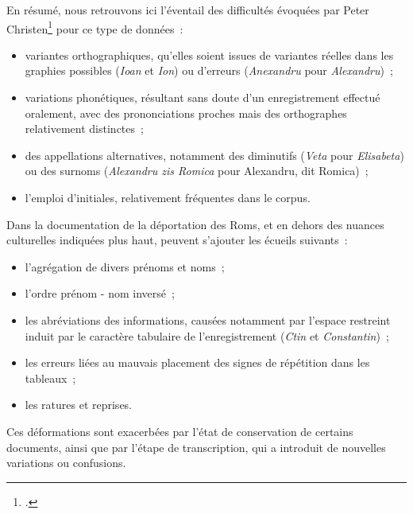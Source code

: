 \documentclass[a4paper,12pt,twoside]{book}
\begin{document}
                En résumé, nous retrouvons ici l'éventail des difficultés évoquées par Peter Christen\footcite{christenComparisonPersonalName2006} pour ce type de données~:
                \vspace{0.8em}
                \begin{itemize}
                    \item variantes orthographiques, qu'elles soient issues de variantes réelles dans les graphies possibles (\textit{Ioan} et \textit{Ion}) ou d'erreurs (\textit{Anexandru} pour \textit{Alexandru})~;
                    \item variations phonétiques, résultant sans doute d'un enregistrement effectué oralement, avec des prononciations proches mais des orthographes relativement distinctes~;
                    \item des appellations alternatives, notamment des diminutifs (\textit{Veta} pour \textit{Elisabeta}) ou des surnoms (\textit{Alexandru zis Romica} pour \og{}Alexandru, dit Romica\fg{})~;
                    \item l'emploi d'initiales, relativement fréquentes dans le corpus.
                \end{itemize}
                \vspace{0.8em}
                Dans la documentation de la déportation des Roms, et en dehors des nuances culturelles indiquées plus haut, peuvent s'ajouter les écueils suivants~:\vspace{0.8em}
                \begin{itemize}
                    \item l'agrégation de divers prénoms et noms~;
                    \item l'ordre prénom - nom inversé~;
                    \item les abréviations des informations, causées notamment par l'espace restreint induit par le caractère tabulaire de l'enregistrement  (\textit{Ctin} et \textit{Constantin})~;
                    \item les erreurs liées au mauvais placement des signes de répétition dans les tableaux~;
                    \item les ratures et reprises.
                \end{itemize}
                \vspace{0.8em}
                Ces déformations sont exacerbées par l'état de conservation de certains documents, ainsi que par l'étape de transcription, qui a introduit de nouvelles variations ou confusions.
                \pagebreak
\end{document}
